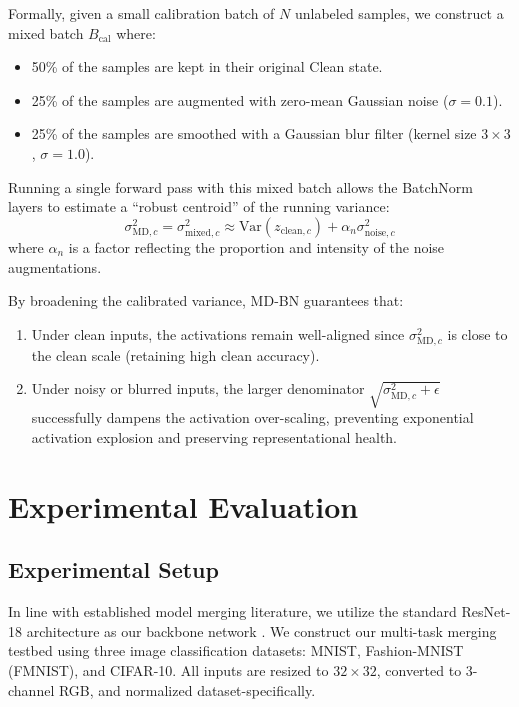 \documentclass{article}
\theoremstyle{plain}
\theoremstyle{definition}
\theoremstyle{remark}
\begin{document}
Formally, given a small calibration batch of $N$ unlabeled samples, we construct a mixed batch $B_{\text{cal}}$ where:
\begin{itemize}
    \item 50\% of the samples are kept in their original Clean state.
    \item 25\% of the samples are augmented with zero-mean Gaussian noise ($\sigma = 0.1$).
    \item 25\% of the samples are smoothed with a Gaussian blur filter (kernel size $3 \times 3$, $\sigma = 1.0$).
\end{itemize}
Running a single forward pass with this mixed batch allows the BatchNorm layers to estimate a ``robust centroid'' of the running variance:
\begin{equation}
    \sigma^2_{\text{MD},c} = \sigma^2_{\text{mixed},c} \approx \text{Var}(z_{\text{clean},c}) + \alpha_n \sigma^2_{\text{noise},c}
\end{equation}
where $\alpha_n$ is a factor reflecting the proportion and intensity of the noise augmentations.

By broadening the calibrated variance, MD-BN guarantees that:
\begin{enumerate}
    \item Under clean inputs, the activations remain well-aligned since $\sigma^2_{\text{MD},c}$ is close to the clean scale (retaining high clean accuracy).
    \item Under noisy or blurred inputs, the larger denominator $\sqrt{\sigma^2_{\text{MD},c} + \epsilon}$ successfully dampens the activation over-scaling, preventing exponential activation explosion and preserving representational health.
\end{enumerate}

\section{Experimental Evaluation}
\label{sec:experiments}

\subsection{Experimental Setup}
In line with established model merging literature, we utilize the standard ResNet-18 architecture as our backbone network \cite{he2016deep, anonymous2026a}. We construct our multi-task merging testbed using three image classification datasets: MNIST, Fashion-MNIST (FMNIST), and CIFAR-10. All inputs are resized to $32 \times 32$, converted to 3-channel RGB, and normalized dataset-specifically.
\end{document}
